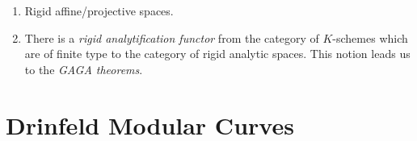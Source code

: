 \documentclass{amsart}
\begin{document}
\begin{example}
    \begin{enumerate}
        \item Rigid affine/projective spaces.

        \item There is a \textit{rigid analytification functor} from the category of $K$-schemes which are of finite type to the category of rigid analytic spaces. This notion leads us to the \textit{GAGA theorems}.
    \end{enumerate}
\end{example}

\section{Drinfeld Modular Curves}
\end{document}
